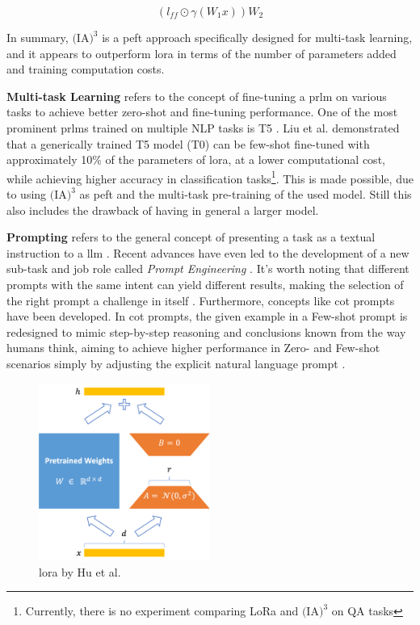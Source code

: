 \begin{equation}
    (l_{ff} \odot \gamma (W_1x))W_2
\end{equation}

In summary, \textbf{$\text{(IA)}^3$} is a \gls{peft} approach specifically designed for multi-task learning, and it appears to outperform \gls{lora} in terms of the number of parameters added and training computation costs.

\textbf{Multi-task Learning} refers to the concept of fine-tuning a \gls{prlm} on various tasks to achieve better zero-shot and fine-tuning performance. One of the most prominent \gls{prlm}s trained on multiple NLP tasks is T5 \cite{raffel_exploring_2023}. Liu et al. \cite{liu_few-shot_2022} demonstrated that a generically trained T5 model (T0) can be few-shot fine-tuned with approximately 10\% of the parameters of \gls{lora}, at a lower computational cost, while achieving higher accuracy in classification tasks\footnote{Currently, there is no experiment comparing LoRa and $\text{(IA)}^3$ on QA tasks}. This is made possible, due to using $\text{(IA)}^3$ as \gls{peft} and the multi-task pre-training of the used model. Still this also includes the drawback of having in general a larger model.

\textbf{Prompting} refers to the general concept of presenting a task as a textual instruction to a \gls{llm} \cite{brown_language_2020}. Recent advances have even led to the development of a new sub-task and job role called \textit{Prompt Engineering} \cite{white_prompt_2023}. It's worth noting that different prompts with the same intent can yield different results, making the selection of the right prompt a challenge in itself \cite{liu_gpt_2021}. Furthermore, concepts like \gls{cot} prompts have been developed. In \gls{cot} prompts, the given example in a Few-shot prompt is redesigned to mimic step-by-step reasoning and conclusions known from the way humans think, aiming to achieve higher performance in Zero- and Few-shot scenarios simply by adjusting the explicit natural language prompt \cite{wei_chain--thought_2023}.

\begin{figure}
    \centering
    \includegraphics[width=0.5\textwidth]{Grafiken/Lora.png}
    \caption{\gls{lora} by Hu et al. \cite{hu_lora_nodate}}
    \label{fig:lora}
\end{figure}



